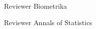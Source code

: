 

%

\begin{cvhonors}

  \cvhonor
    {Reviewer} %
    {Biometrika} %
    {} %
    {} %

  \cvhonor
    {Reviewer} %
    {Annals of Statistics} %
    {} %
    {} %

\end{cvhonors}
